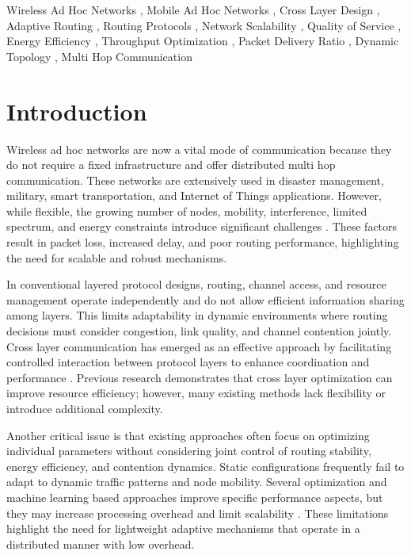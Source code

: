 \documentclass[a4paper,fleqn,final,1p]{cas-dc}
\numberwithin{equation}{section}
\begin{document}
\begin{keywords}
Wireless Ad Hoc Networks \sep 
Mobile Ad Hoc Networks \sep 
Cross Layer Design \sep 
Adaptive Routing \sep 
Routing Protocols \sep 
Network Scalability \sep 
Quality of Service \sep 
Energy Efficiency \sep 
Throughput Optimization \sep  
Packet Delivery Ratio \sep 
Dynamic Topology \sep 
Multi Hop Communication
\end{keywords}

\begingroup
\let\clearpage\relax
\let\newpage\relax
\maketitle
\endgroup

\section{Introduction}

Wireless ad hoc networks are now a vital mode of communication because they do not require a fixed infrastructure and offer distributed multi hop communication. These networks are extensively used in disaster management, military, smart transportation, and Internet of Things applications. However, while flexible, the growing number of nodes, mobility, interference, limited spectrum, and energy constraints introduce significant challenges \cite{mashhadani2025security, iyoloma2025survey, qian2024wireless, prakash2024}. These factors result in packet loss, increased delay, and poor routing performance, highlighting the need for scalable and robust mechanisms.

In conventional layered protocol designs, routing, channel access, and resource management operate independently and do not allow efficient information sharing among layers. This limits adaptability in dynamic environments where routing decisions must consider congestion, link quality, and channel contention jointly. Cross layer communication has emerged as an effective approach by facilitating controlled interaction between protocol layers to enhance coordination and performance \cite{priya2024, inzimam2024, hemalatha2024, ojeda2024}. Previous research demonstrates that cross layer optimization can improve resource efficiency; however, many existing methods lack flexibility or introduce additional complexity.

Another critical issue is that existing approaches often focus on optimizing individual parameters without considering joint control of routing stability, energy efficiency, and contention dynamics. Static configurations frequently fail to adapt to dynamic traffic patterns and node mobility. Several optimization and machine learning based approaches improve specific performance aspects, but they may increase processing overhead and limit scalability \cite{SanthoshKumar2025280, Aluri2025707, allaw2024}. These limitations highlight the need for lightweight adaptive mechanisms that operate in a distributed manner with low overhead.
\end{document}
